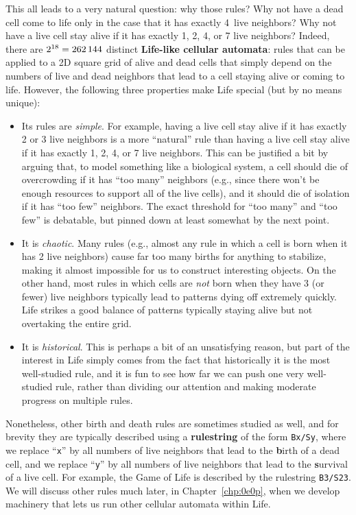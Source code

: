 This all leads to a very natural question: why those rules? Why not have a dead cell come to life only in the case that it has exactly 4~live neighbors? Why not have a live cell stay alive if it has exactly 1, 2, 4, or 7 live neighbors? Indeed, there are $2^{18} = 262{\,}144$ distinct \textbf{Life-like cellular automata}: rules that can be applied to a 2D square grid of alive and dead cells that simply depend on the numbers of live and dead neighbors that lead to a cell staying alive or coming to life. However, the following three properties make Life special (but by no means unique):\smallskip

\begin{itemize}
	\item Its rules are \emph{simple}. For example, having a live cell stay alive if it has exactly 2 or 3 live neighbors is a more ``natural'' rule than having a live cell stay alive if it has exactly 1, 2, 4, or 7 live neighbors. This can be justified a bit by arguing that, to model something like a biological system, a cell should die of overcrowding if it has ``too many'' neighbors (e.g., since there won't be enough resources to support all of the live cells), and it should die of isolation if it has ``too few'' neighbors. The exact threshold for ``too many'' and ``too few'' is debatable, but pinned down at least somewhat by the next point.\smallskip
	
	\item It is \emph{chaotic}. Many rules (e.g., almost any rule in which a cell is born when it has 2 live neighbors) cause far too many births for anything to stabilize, making it almost impossible for us to construct interesting objects. On the other hand, most rules in which cells are \emph{not} born when they have $3$ (or fewer) live neighbors typically lead to patterns dying off extremely quickly. Life strikes a good balance of patterns typically staying alive but not overtaking the entire grid.\smallskip
	
	\item It is \emph{historical}. This is perhaps a bit of an unsatisfying reason, but part of the interest in Life simply comes from the fact that historically it is the most well-studied rule, and it is fun to see how far we can push one very well-studied rule, rather than dividing our attention and making moderate progress on multiple rules.\smallskip
\end{itemize}

Nonetheless, other birth and death rules are sometimes studied as well, and for brevity they are typically described using a \textbf{rulestring} of the form \texttt{Bx/Sy}, where we replace ``\texttt{x}'' by all numbers of live neighbors that lead to the \textbf{b}irth of a dead cell, and we replace ``\texttt{y}'' by all numbers of live neighbors that lead to the \textbf{s}urvival of a live cell. For example, the Game of Life is described by the rulestring \texttt{B3/S23}. We will discuss other rules much later, in Chapter~\ref{chp:0e0p}, when we develop machinery that lets us run other cellular automata within Life.


